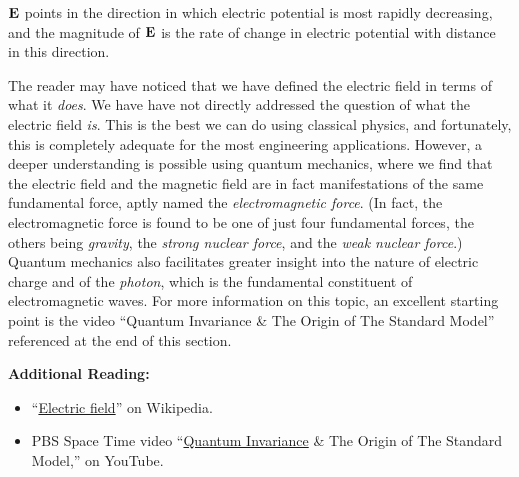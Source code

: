 \begin{mdframed}[backgroundcolor=yellow!20,nobreak=true] 
${\bf E}$ points in the direction in which electric potential is most rapidly decreasing, and the magnitude of ${\bf E}$ is the rate of change in electric potential with distance in this direction.  
\end{mdframed}

The reader may have noticed that we have defined the electric field in terms of what it \emph{does}.
We have have not directly addressed the question of what the electric field \emph{is}.  
This is the best we can do using classical physics, and
fortunately, this is completely adequate for the most engineering applications.
However, a deeper understanding is possible using quantum mechanics, 
where we find that the electric field and the magnetic field are in fact manifestations of the same fundamental force, aptly named the \emph{electromagnetic force}.
(In fact, the electromagnetic force is found to be one of just four fundamental forces, the others being \emph{gravity}, the \emph{strong nuclear force}, and the \emph{weak nuclear force}.)
Quantum mechanics also facilitates greater insight into the nature of electric charge and of the \emph{photon}, 
which is the fundamental constituent of electromagnetic waves.  
For more information on this topic, an excellent starting point is the video ``Quantum Invariance \& The Origin of The Standard Model'' referenced at the end of this section.


{\bf Additional Reading:}
\begin{itemize}
\item ``\href{https://en.wikipedia.org/wiki/Electric_field}{Electric field}'' on Wikipedia.
\item PBS Space Time video ``\href{https://youtu.be/V5kgruUjVBs}{Quantum Invariance} \& The Origin of The Standard Model,'' on YouTube.
\end{itemize}

